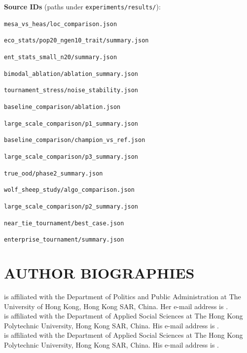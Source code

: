 \documentclass{wscpaperproc}
\begin{document}
\noindent\textbf{Source IDs} (paths under \texttt{experiments/results/}):

\begin{description}\setlength{\itemsep}{0pt}\setlength{\parsep}{0pt}\small
  \item[S1] \nolinkurl{mesa_vs_heas/loc_comparison.json}
  \item[S2] \nolinkurl{eco_stats/pop20_ngen10_trait/summary.json}
  \item[S2b] \nolinkurl{ent_stats_small_n20/summary.json}
  \item[S2c] \nolinkurl{bimodal_ablation/ablation_summary.json}
  \item[S3] \nolinkurl{tournament_stress/noise_stability.json}
  \item[S4] \nolinkurl{baseline_comparison/ablation.json}
  \item[S5] \nolinkurl{large_scale_comparison/p1_summary.json}
  \item[S6a] \nolinkurl{baseline_comparison/champion_vs_ref.json}
  \item[S6b] \nolinkurl{large_scale_comparison/p3_summary.json}
  \item[S6c] \nolinkurl{true_ood/phase2_summary.json}
  \item[S7] \nolinkurl{wolf_sheep_study/algo_comparison.json}
  \item[S8] \nolinkurl{large_scale_comparison/p2_summary.json}
  \item[S9] \nolinkurl{near_tie_tournament/best_case.json}
  \item[S10] \nolinkurl{enterprise_tournament/summary.json}
\end{description}

\begingroup
\small


\endgroup

\section*{AUTHOR BIOGRAPHIES}

 is affiliated with the Department of Politics and Public Administration at The University of Hong Kong, Hong Kong SAR, China. Her e-mail address is .\\

 is affiliated with the Department of Applied Social Sciences at The Hong Kong Polytechnic University, Hong Kong SAR, China. His e-mail address is .\\

 is affiliated with the Department of Applied Social Sciences at The Hong Kong Polytechnic University, Hong Kong SAR, China. His e-mail address is .
\end{document}
